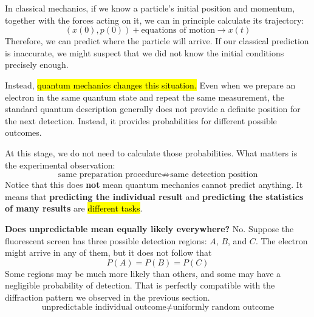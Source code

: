 \highspace
In classical mechanics, if we know a particle's initial position and momentum, together with the forces acting on it, we can in principle calculate its trajectory:
\begin{equation*}
    \left(x(0),p(0)\right)
    +
    \text{equations of motion}
    \longrightarrow
    x(t)
\end{equation*}
Therefore, we can predict where the particle will arrive. If our classical prediction is inaccurate, we might suspect that we did not know the initial conditions precisely enough.

\highspace
Instead, \hl{quantum mechanics changes this situation.} Even when we prepare an electron in the same quantum state and repeat the same measurement, the standard quantum description generally does not provide a definite position for the next detection. Instead, it provides probabilities for different possible outcomes.

\highspace
At this stage, we do not need to calculate those probabilities. What matters is the experimental observation:
\begin{equation*}
    \text{same preparation procedure}
    \not\Rightarrow
    \text{same detection position}
\end{equation*}
Notice that this does \textbf{not} mean quantum mechanics cannot predict anything. It means that \textbf{predicting the individual result} and \textbf{predicting the statistics of many results} are \hl{different tasks}.

\highspace
\textcolor{Green3}{ \textbf{Does unpredictable mean equally likely everywhere?}} No. Suppose the fluorescent screen has three possible detection regions: $A$, $B$, and $C$. The electron might arrive in any of them, but it does not follow that
\begin{equation*}
    P(A)=P(B)=P(C)
\end{equation*}
Some regions may be much more likely than others, and some may have a negligible probability of detection. That is perfectly compatible with the diffraction pattern we observed in the previous section.
\begin{equation*}
    \text{unpredictable individual outcome}\neq\text{uniformly random outcome}
\end{equation*}

